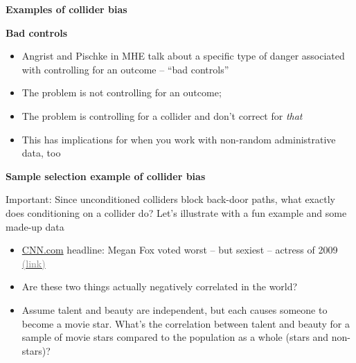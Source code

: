 \documentclass[notes=show]{beamer}
\newcommand{\myurlshort}[2]{\href{#1}{\textcolor{gray}{\textsf{#2}}}}
\begin{document}
\begin{frame}[plain]
\begin{center}
\textbf{Examples of collider bias}
\end{center}

\end{frame}


\begin{frame}[plain]
\begin{center}
\textbf{Bad controls}
\end{center}

\begin{itemize}
\item Angrist and Pischke in MHE talk about a specific type of danger associated with controlling for an outcome -- ``bad controls''
\item The problem is not controlling for an outcome;
\item The problem is controlling for a collider and don't correct for \emph{that}
\item This has implications for when you work with non-random administrative data, too
\end{itemize}

\end{frame}

\begin{frame}[plain]
	\begin{center}
	\textbf{Sample selection example of collider bias}
	\end{center}

	\alert{Important}: Since unconditioned colliders block back-door paths, what exactly does conditioning on a collider do? Let's illustrate with a fun example and some made-up data\\
	\begin{itemize}
	\item \underline{CNN.com} headline: Megan Fox voted worst -- but sexiest -- actress of 2009 \myurlshort{http://marquee.blogs.cnn.com/2009/12/30/megan-fox-voted-worst-but-sexiest-actress-of-2009/}{(link)}
	\item Are these two things actually negatively correlated in the world?
	\item Assume talent and beauty are independent, but each causes someone to become a movie star.  What's the correlation between talent and beauty for a sample of movie stars compared to the population as a whole (stars and non-stars)?
	\end{itemize}

\end{frame}
\end{document}
